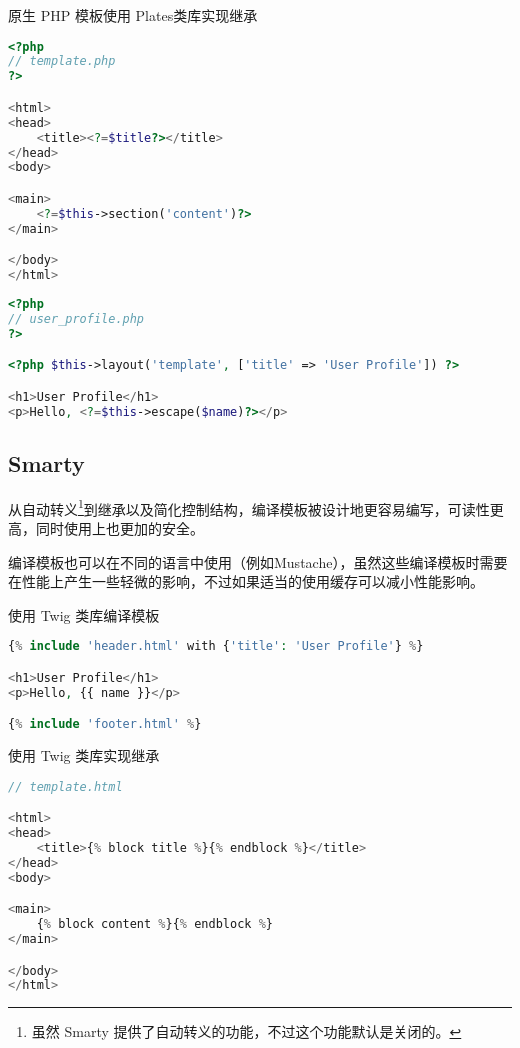 \begin{example}
原生 PHP 模板使用 Plates类库实现继承
\begin{lstlisting}[language=PHP]
<?php
// template.php
?>

<html>
<head>
    <title><?=$title?></title>
</head>
<body>

<main>
    <?=$this->section('content')?>
</main>

</body>
</html>
\end{lstlisting}
\end{example}

\begin{lstlisting}[language=PHP]
<?php
// user_profile.php
?>

<?php $this->layout('template', ['title' => 'User Profile']) ?>

<h1>User Profile</h1>
<p>Hello, <?=$this->escape($name)?></p>
\end{lstlisting}

\subsection{Smarty}

从自动转义\footnote{虽然 Smarty 提供了自动转义的功能，不过这个功能默认是关闭的。}到继承以及简化控制结构，编译模板被设计地更容易编写，可读性更高，同时使用上也更加的安全。

编译模板也可以在不同的语言中使用（例如Mustache），虽然这些编译模板时需要在性能上产生一些轻微的影响，不过如果适当的使用缓存可以减小性能影响。

\begin{example}
使用 Twig 类库编译模板
\begin{lstlisting}[language=PHP]
{% include 'header.html' with {'title': 'User Profile'} %}

<h1>User Profile</h1>
<p>Hello, {{ name }}</p>

{% include 'footer.html' %}
\end{lstlisting}
\end{example}

\begin{example}
使用 Twig 类库实现继承
\begin{lstlisting}[language=PHP]
// template.html

<html>
<head>
    <title>{% block title %}{% endblock %}</title>
</head>
<body>

<main>
    {% block content %}{% endblock %}
</main>

</body>
</html>
\end{lstlisting}
\end{example}


